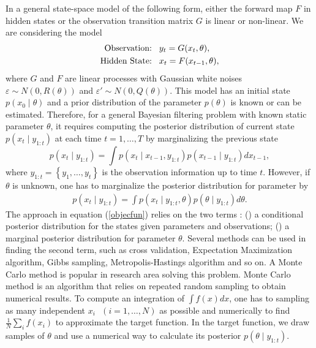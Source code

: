 In a general state-space model of the following form, either the forward map $F$ in hidden states or the observation transition matrix $G$ is linear or non-linear. We are considering the model 
\begin{align}\label{MCMCobserY}
\mbox{Observation:}\hspace*{0.3cm}   & y_t=G(x_t,\theta), \\
\mbox{Hidden State:}\hspace*{0.3cm} & x_t=F(x_{t-1},\theta),\label{MCMChiddX}
\end{align}
where $G$ and $F$ are linear processes with Gaussian white noises $\varepsilon\sim N\left( 0,R(\theta) \right)$ and $\varepsilon'\sim N\left( 0,Q(\theta) \right)$. This model has an initial state $p(x_0\mid \theta)$ and a prior distribution of the parameter $p(\theta)$ is known or can be estimated. Therefore, for a general Bayesian filtering problem with known static parameter $\theta$, it requires computing the posterior distribution of current state $p(x_t \mid y_{1:t})$ at each time $t=1,\dots, T$ by marginalizing the previous state
\begin{equation*}
p(x_t\mid y_{1:t}) = \int p(x_t\mid x_{t-1},y_{1:t})p(x_{t-1}\mid y_{1:t}) dx_{t-1}, 
\end{equation*}
where $y_{1:t} = \left\lbrace y_1,\dots,y_t\right\rbrace$ is the observation information up to time $t$. However, if $\theta$ is unknown, one has to marginalize the posterior distribution for parameter by 
\begin{align}\label{objecfun}
p(x_t \mid y_{1:t}) = \int p(x_t \mid y_{1:t},\theta)p(\theta\mid y_{1:t})d\theta.
\end{align}
The approach in equation (\ref{objecfun}) relies on the two terms : () a conditional posterior distribution for the states given parameters and observations; () a marginal posterior distribution for parameter $\theta$. Several methods can be used in finding the second term, such as cross validation, Expectation Maximization algorithm, Gibbs sampling, Metropolis-Hastings algorithm and so on. A Monte Carlo method is popular in research area solving this problem. Monte Carlo method is an algorithm that relies on repeated random sampling to obtain numerical results. To compute an integration of $\int f(x)dx$, one has to sampling as many independent $x_i \mbox{ } (i = 1,\dots, N)$ as possible and numerically to find $\frac{1}{N}\sum_i f(x_i)$ to approximate the target function. In the target function, we draw samples of $\theta$ and use a numerical way to calculate its posterior $p(\theta\mid y_{1:t})$. 


